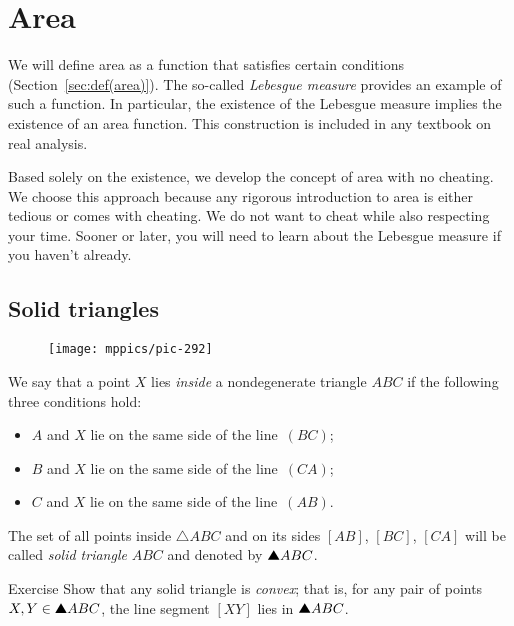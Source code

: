 \chapter{Area}
\label{chap:area}

We will define area as a function that satisfies certain conditions (Section~\ref{sec:def(area)}).
The so-called {}\emph{Lebesgue measure} provides an example of such a function.
In particular, the existence of the Lebesgue measure implies the existence of an area function.
This construction is included in any textbook on real analysis.

Based solely on the existence, we develop the concept of area with no cheating.
We choose this approach because any rigorous introduction to area is either tedious or comes with cheating.
We do not want to cheat while also respecting your time. 
Sooner or later, you will need to learn about the Lebesgue measure if you haven't already.


\section{Solid triangles}

{

\begin{wrapfigure}{r}{27 mm}
\vskip-8mm
\centering
\texttt{[image: mppics/pic-292]}
\end{wrapfigure}

We say that a point $X$ lies \emph{inside} a nondegenerate triangle $ABC$ if the following three conditions hold:

\begin{itemize}
\item $A$ and $X$ lie on the same side of the line~$(BC)$;
\item $B$ and $X$ lie on the same side of the line~$(CA)$;
\item $C$ and $X$ lie on the same side of the line~$(AB)$.
\end{itemize}

}

The set of all points inside $\triangle ABC$ 
and on its sides $[AB]$, $[BC]$, $[CA]$
will be called \emph{solid triangle} $ABC$ and denoted by $\solidtriangle ABC$.

\begin{thm}{Exercise}\label{ex:triangle-convex}
Show that any solid triangle is \emph{convex};
that is, for any pair of points $X,Y\z\in\solidtriangle ABC$,
the line segment $[XY]$ lies in  $\solidtriangle ABC$.
\end{thm}



